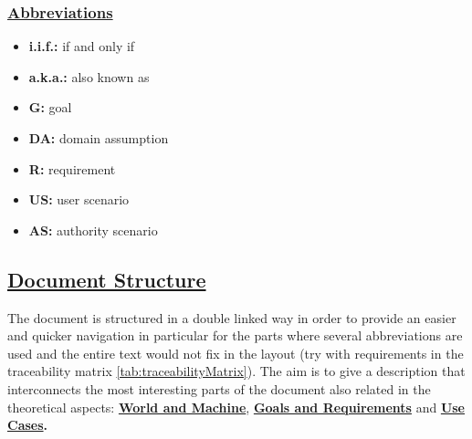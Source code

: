 	\subsubsection[Abbreviations]{\hyperlink{toc}{Abbreviations}}
		\begin{itemize}
	        \item \textbf{i.i.f.:} if and only if
	        \item \textbf{a.k.a.:} also known as
			\item \textbf{G:} goal
			\item \textbf{DA:} domain assumption
			\item \textbf{R:} requirement
			\item \textbf{US:} user scenario
			\item \textbf{AS:} authority scenario
		\end{itemize}
		
\subsection[Document Structure]{\hyperlink{toc}{Document Structure}}
	The document is structured in a double linked way in order to provide an easier and quicker navigation in particular for the parts where several abbreviations are used and the entire text would not fix in the layout (try with requirements in the traceability matrix \ref{tab:traceabilityMatrix}). The aim is to give a description that interconnects the most interesting parts of the document also related in the theoretical aspects: \textbf{\hyperref[sec:worldMachine]{World and Machine}},
	\textbf{\hyperref[sec:goalSatisfaction]{Goals and Requirements}}  and \textbf{\hyperref[sec:useCases]{Use Cases}.}\\
	
